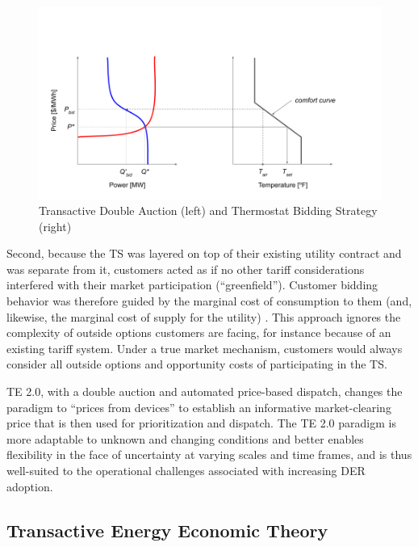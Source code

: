 \begin{figure}[t]
\centering
\includegraphics[scale=0.5]{images/TE_DA.png}
\caption{Transactive Double Auction (left) and Thermostat Bidding Strategy (right)}
\label{fig:Transactive_DA}
\end{figure}

Second, because the TS was layered on top of their existing utility contract and was separate from it, customers acted as if no other tariff considerations interfered with their market participation (``greenfield''). Customer bidding behavior was therefore guided by the marginal cost of consumption to them (and, likewise, the marginal cost of supply for the utility) \citep{chassin_kiesling_2008}. This approach ignores the complexity of outside options customers are facing, for instance because of an existing tariff system. Under a true market mechanism, customers would always consider all outside options and opportunity costs of participating in the TS.

TE 2.0, with a double auction and automated price-based dispatch, changes the paradigm to ``prices from devices'' to establish an informative market-clearing price that is then used for prioritization and dispatch. The TE 2.0 paradigm is more adaptable to unknown and changing conditions and better enables flexibility in the face of uncertainty at varying scales and time frames, and is thus well-suited to the operational challenges associated with increasing DER adoption.

\subsection{Transactive Energy Economic Theory}\label{sec:teecon}


